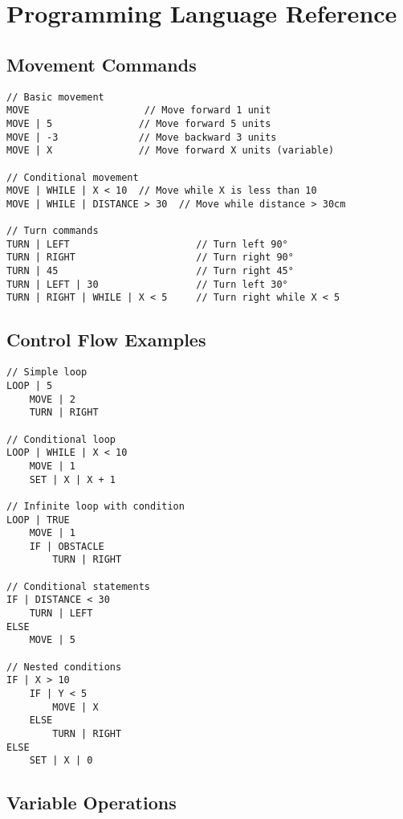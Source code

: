 \section{Programming Language Reference}

\subsection{Movement Commands}

\begin{lstlisting}[caption=Movement Command Examples]
// Basic movement
MOVE                    // Move forward 1 unit
MOVE | 5               // Move forward 5 units
MOVE | -3              // Move backward 3 units
MOVE | X               // Move forward X units (variable)

// Conditional movement
MOVE | WHILE | X < 10  // Move while X is less than 10
MOVE | WHILE | DISTANCE > 30  // Move while distance > 30cm

// Turn commands
TURN | LEFT                      // Turn left 90°
TURN | RIGHT                     // Turn right 90°
TURN | 45                        // Turn right 45°
TURN | LEFT | 30                 // Turn left 30°
TURN | RIGHT | WHILE | X < 5     // Turn right while X < 5
\end{lstlisting}

\subsection{Control Flow Examples}

\begin{lstlisting}[caption=Control Flow Examples]
// Simple loop
LOOP | 5
    MOVE | 2
    TURN | RIGHT

// Conditional loop
LOOP | WHILE | X < 10
    MOVE | 1
    SET | X | X + 1

// Infinite loop with condition
LOOP | TRUE
    MOVE | 1
    IF | OBSTACLE
        TURN | RIGHT

// Conditional statements
IF | DISTANCE < 30
    TURN | LEFT
ELSE
    MOVE | 5

// Nested conditions
IF | X > 10
    IF | Y < 5
        MOVE | X
    ELSE
        TURN | RIGHT
ELSE
    SET | X | 0
\end{lstlisting}

\subsection{Variable Operations}

